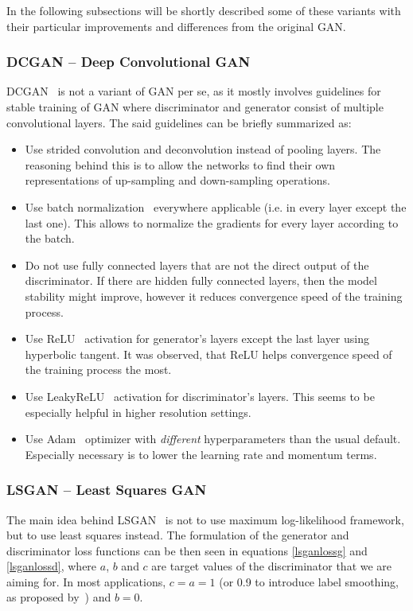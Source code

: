 In the following subsections will be shortly described some of these variants with their particular improvements and differences from the original GAN.

\subsubsection{DCGAN -- Deep Convolutional GAN}
DCGAN~\cite{dcgan} is not a variant of GAN per se, as it mostly involves guidelines for stable training of GAN where discriminator and generator consist of multiple convolutional layers. The said guidelines can be briefly summarized as:
\begin{itemize}
\item Use strided convolution and deconvolution instead of pooling layers. The reasoning behind this is to allow the networks to find their own representations of up-sampling and down-sampling operations.
\item Use batch normalization~\cite{batchnorm} everywhere applicable (i.e. in every layer except the last one). This allows to normalize the gradients for every layer according to the batch.
\item Do not use fully connected layers that are not the direct output of the discriminator. If there are hidden fully connected layers, then the model stability might improve, however it reduces convergence speed of the training process.
\item Use ReLU~\cite{relu} activation for generator's layers except the last layer using hyperbolic tangent. It was observed, that ReLU helps convergence speed of the training process the most.
\item Use LeakyReLU~\cite{leakyrelu} activation for discriminator's layers. This seems to be especially helpful in higher resolution settings.
\item Use Adam~\cite{adam} optimizer with {\em different} hyperparameters than the usual default. Especially necessary is to lower the learning rate and momentum terms.
\end{itemize}

\subsubsection{LSGAN -- Least Squares GAN}
The main idea behind LSGAN~\cite{lsgan} is not to use maximum log-likelihood framework, but to use least squares instead. The formulation of the generator and discriminator loss functions can be then seen in equations \ref{lsganlossg} and \ref{lsganlossd}, where $a$, $b$ and $c$ are target values of the discriminator that we are aiming for. In most applications, $c = a = 1$ (or 0.9 to introduce label smoothing, as proposed by~\cite{improvedgan,smooth}) and $b = 0$.

